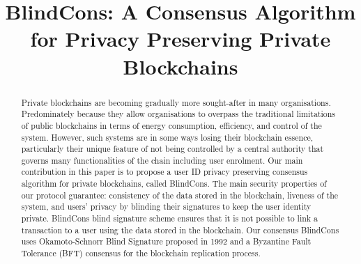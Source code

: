 \documentclass[conference]{llncs}
\newcommand{\name}{BlindCons}
\begin{document}
\title{\name{}: A Consensus Algorithm for Privacy Preserving Private Blockchains\\}


\maketitle


\begin{abstract}
Private blockchains are becoming gradually more sought-after in many organisations. Predominately because they allow organisations to overpass the traditional limitations of public blockchains in terms of energy consumption, efficiency, and control of the system. However, such systems are in some ways losing their blockchain essence, particularly their unique feature of not being controlled by a central authority that governs many functionalities of the chain including user enrolment. Our main contribution in this paper is to propose a user ID privacy preserving consensus algorithm for private blockchains, called \name{}. The main security properties of our protocol guarantee: consistency of the data stored in the blockchain, liveness of the system, and users' privacy by blinding their signatures to keep the user identity private. \name{} blind signature scheme ensures that it is not possible to link a transaction to a user using the data stored in the blockchain. Our consensus BlindCons uses Okamoto-Schnorr Blind Signature proposed in 1992 and a Byzantine Fault Tolerance (BFT) consensus for the blockchain replication process.
\end{abstract}

\end{document}
